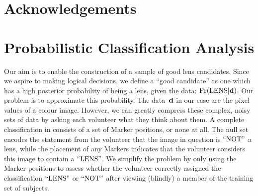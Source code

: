 \documentclass[useAMS,usenatbib,a4paper]{mn2e}
\begin{document}

\section*{Acknowledgements}
 



\appendix


\section{Probabilistic Classification Analysis}
\label{appendix:swap}

Our aim is to enable the construction of a sample of good lens candidates.
Since we aspire to making logical  decisions, we define a  ``good candidate''
as one which has a high posterior probability of being a lens, given the data:
${\rm Pr}({\rm LENS}|{\mathbf{d}})$. Our problem is to approximate this probability. The data~${\mathbf{d}}$
in our case are the pixel values of a colour image. However, we can greatly
compress these complex, noisy sets of data by asking each volunteer what they
think about them. A complete  classification in \sw consists of a set of
Marker positions, or none at all. The null set encodes the statement from
the volunteer that the image in question is ${\rm ``NOT"}$ a lens, while the
placement of any  Markers indicates that the volunteer considers this image to
contain a ${\rm ``LENS"}$.  We simplify the problem by only using the Marker
positions to assess whether the volunteer  correctly assigned the
classification ${\rm ``LENS"}$ or ${\rm ``NOT"}$ after viewing (blindly) a member of
the training set of subjects. 
\end{document}
